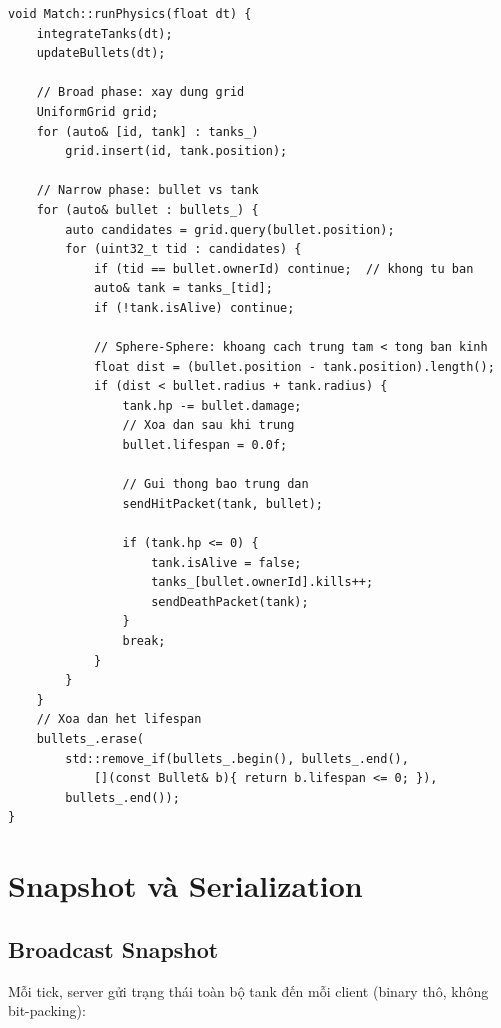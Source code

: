 \documentclass[12pt,a4paper]{report}
\begin{document}
\begin{lstlisting}[style=cppStyle, caption={Phát hiện va chạm đạn với tank}, label={lst:bulletcollide}]
void Match::runPhysics(float dt) {
    integrateTanks(dt);
    updateBullets(dt);

    // Broad phase: xay dung grid
    UniformGrid grid;
    for (auto& [id, tank] : tanks_)
        grid.insert(id, tank.position);

    // Narrow phase: bullet vs tank
    for (auto& bullet : bullets_) {
        auto candidates = grid.query(bullet.position);
        for (uint32_t tid : candidates) {
            if (tid == bullet.ownerId) continue;  // khong tu ban
            auto& tank = tanks_[tid];
            if (!tank.isAlive) continue;

            // Sphere-Sphere: khoang cach trung tam < tong ban kinh
            float dist = (bullet.position - tank.position).length();
            if (dist < bullet.radius + tank.radius) {
                tank.hp -= bullet.damage;
                // Xoa dan sau khi trung
                bullet.lifespan = 0.0f;

                // Gui thong bao trung dan
                sendHitPacket(tank, bullet);

                if (tank.hp <= 0) {
                    tank.isAlive = false;
                    tanks_[bullet.ownerId].kills++;
                    sendDeathPacket(tank);
                }
                break;
            }
        }
    }
    // Xoa dan het lifespan
    bullets_.erase(
        std::remove_if(bullets_.begin(), bullets_.end(),
            [](const Bullet& b){ return b.lifespan <= 0; }),
        bullets_.end());
}
\end{lstlisting}

\section{Snapshot và Serialization}

\subsection{Broadcast Snapshot}

Mỗi tick, server gửi trạng thái toàn bộ tank đến mỗi client (binary thô, không bit-packing):
\end{document}
